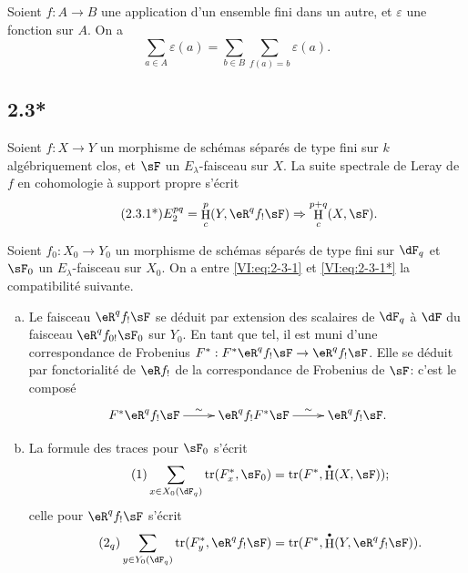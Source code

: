 \documentclass[oneside]{book}
\DeclareMathOperator{\h}{H}
\DeclareMathOperator{\tr}{tr}
\theoremstyle{sga-source}
\theoremstyle{sga-source-dash}
\theoremstyle{sga-source-dotdash}
\theoremstyle{sga-source-number-note-dash}
\theoremstyle{sga-source-note-number-dotdash}
\theoremstyle{sga-source-example-dotdash}
\theoremstyle{sga-source-inline-number}
\theoremstyle{sga-source-bare-number}
\theoremstyle{sga-source}
\let\oldbullet\bullet
\renewcommand{\bullet}{\textnormal{\tiny$\oldbullet$}}
\newcommand{\PrintPage}[1]{}\newcommand{\MathPage}[1]{}\newcommand{\PrintCite}[2]{#1}\newcommand{\var}[3]{#1}
\begin{document}
\subsection{}\label{VI:2-3}

Soient $f:A\to B$ une application d'un ensemble fini dans un autre, et 
$\varepsilon$ une fonction sur $A$. On a 
\begin{equation*}\tag{2.3.1}\label{VI:eq:2-3-1}
  \sum_{a\in A} \varepsilon(a) = \sum_{b\in B} \sum_{f(a)=b} \varepsilon(a) \text{.}
\end{equation*}





\PrintPage{184}
\subsection*{2.3*}\label{VI:2-3*}

Soient $f:X\to Y$ un morphisme de schémas séparés de type fini sur $k$ 
algébriquement clos, et $\sF$ un $E_\lambda$-faisceau sur $X$. La suite 
spectrale de Leray de $f$ en cohomologie à support propre s'écrit 
\begin{align*}\tag{2.3.1*}\label{VI:eq:2-3-1*}
  E_2^{p q} = \h_c^p(Y,\eR^q f_! \sF) \Rightarrow \h_c^{p+q}(X,\sF) \text{.}
\end{align*}

Soient $f_0:X_0 \to Y_0$ un morphisme de schémas séparés de type fini sur 
$\dF_q$ et $\sF_0$ un $E_\lambda$-faisceau sur $X_0$. On a entre 
\eqref{VI:eq:2-3-1} et \eqref{VI:eq:2-3-1*} la compatibilité suivante. 

\begin{enumerate}[a)]
  \item Le faisceau $\eR^q f_! \sF$ se déduit par extension des scalaires de 
    $\dF_q$ à $\dF$ du faisceau $\eR^q f_{0!} \sF_0$ sur $Y_0$. En tant que 
    tel, il est muni d'une correspondance de Frobenius 
    $F^\ast:F^\ast\eR^q f_! \sF \to \eR^q f_! \sF$. Elle se déduit par 
    fonctorialité de $\eR f_!$ de la correspondance de Frobenius de $\sF$: 
    c'est le composé 
    \[\xymatrix{
      F^\ast \eR^q f_! \sF \ar[r]^-\sim 
        & \eR^q f_! F^\ast \sF \ar[r]^-\sim 
        & \eR^q f_! \sF \text{.}
    }\]
  \item La formule des traces pour $\sF_0$ s'écrit 
    \begin{align*}\tag{1}\label{VI:eq:1}
      \sum_{x\in X_0(\dF_q)} \tr(F_x^\ast,\sF_0) = \var{\tr(F^\ast,\h^\bullet(X,\sF))}{\tr(F^\ast,\h_c^\bullet(X,\sF))}{S45-SOL-0736} \text{;}
    \end{align*}
    celle pour $\eR^q f_! \sF$ s'écrit 
    \begin{align*}\tag{2$_q$}\label{VI:eq:2_q} 
      \sum_{y\in Y_0(\dF_q)} \tr(F_y^\ast,\eR^q f_! \sF) = \var{\tr(F^\ast, \h^\bullet(Y,\eR^q f_! \sF))}{\tr(F^\ast,\h_c^\bullet(Y,\eR^q f_! \sF))}{S45-SOL-0737} \text{.}
    \end{align*}
\end{enumerate}
\end{document}
